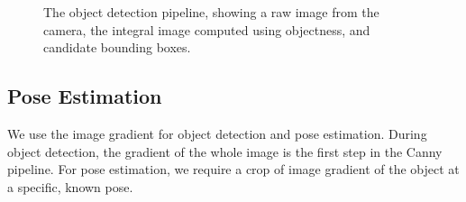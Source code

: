 \documentclass{article}
\begin{document}
\begin{figure}
%
%
%
\caption{The object detection pipeline, showing a raw image from the
  camera, the integral image computed using objectness, and candidate
  bounding boxes.\label{fig:object_detection}}
\end{figure}



 
\subsection{Pose Estimation}

We use the image gradient for object detection and pose estimation. During
object detection, the gradient of the whole image is the first step in the Canny pipeline.
For pose estimation,  we require a crop of  image gradient of the object
at a specific, known pose. 

\end{document}
